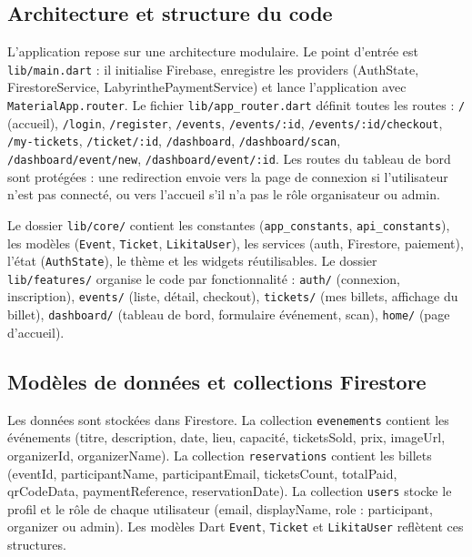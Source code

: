 \documentclass[11pt,a4paper,oneside]{article}
\begin{document}
\subsection{Architecture et structure du code}

L'application repose sur une architecture modulaire. Le point d'entrée est \texttt{lib/main.dart} : il initialise Firebase, enregistre les providers (AuthState, FirestoreService, LabyrinthePaymentService) et lance l'application avec \texttt{MaterialApp.router}. Le fichier \texttt{lib/app\_router.dart} définit toutes les routes : \texttt{/} (accueil), \texttt{/login}, \texttt{/register}, \texttt{/events}, \texttt{/events/:id}, \texttt{/events/:id/checkout}, \texttt{/my-tickets}, \texttt{/ticket/:id}, \texttt{/dashboard}, \texttt{/dashboard/scan}, \texttt{/dashboard/event/new}, \texttt{/dashboard/event/:id}. Les routes du tableau de bord sont protégées : une redirection envoie vers la page de connexion si l'utilisateur n'est pas connecté, ou vers l'accueil s'il n'a pas le rôle organisateur ou admin.

Le dossier \texttt{lib/core/} contient les constantes (\texttt{app\_constants}, \texttt{api\_constants}), les modèles (\texttt{Event}, \texttt{Ticket}, \texttt{LikitaUser}), les services (auth, Firestore, paiement), l'état (\texttt{AuthState}), le thème et les widgets réutilisables. Le dossier \texttt{lib/features/} organise le code par fonctionnalité : \texttt{auth/} (connexion, inscription), \texttt{events/} (liste, détail, checkout), \texttt{tickets/} (mes billets, affichage du billet), \texttt{dashboard/} (tableau de bord, formulaire événement, scan), \texttt{home/} (page d'accueil).

\subsection{Modèles de données et collections Firestore}

Les données sont stockées dans Firestore. La collection \texttt{evenements} contient les événements (titre, description, date, lieu, capacité, ticketsSold, prix, imageUrl, organizerId, organizerName). La collection \texttt{reservations} contient les billets (eventId, participantName, participantEmail, ticketsCount, totalPaid, qrCodeData, paymentReference, reservationDate). La collection \texttt{users} stocke le profil et le rôle de chaque utilisateur (email, displayName, role : participant, organizer ou admin). Les modèles Dart \texttt{Event}, \texttt{Ticket} et \texttt{LikitaUser} reflètent ces structures.
\end{document}
